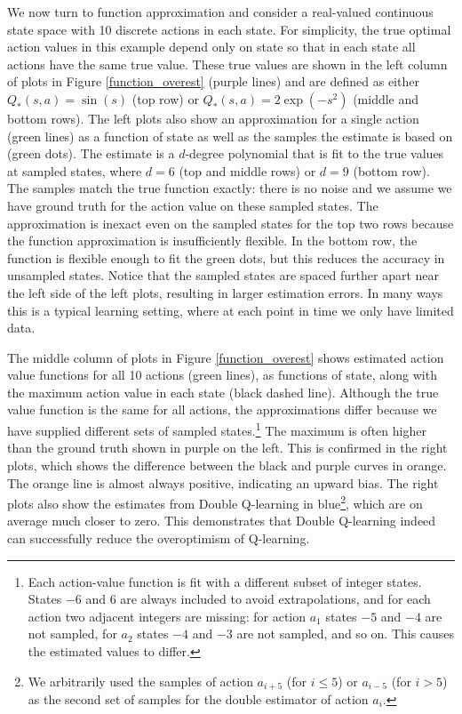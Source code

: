 \documentclass[letterpaper]{article}
\begin{document}
We now turn to function approximation and consider a real-valued continuous state space with 10 discrete actions in each state. For simplicity, the true optimal action values in this example depend only on state so that in each state all actions have the same true value. These true values are shown in the left column of plots in Figure \ref{function_overest} (purple lines) and are defined as either $Q_*(s,a) = \sin(s)$ (top row) or $Q_*(s,a) = 2 \exp(-s^2)$ (middle and bottom rows). The left plots also show an approximation for a single action (green lines) as a function of state as well as the samples the estimate is based on (green dots).  The estimate is a $d$-degree polynomial that is fit to the true values at sampled states, where $d=6$ (top and middle rows) or $d=9$ (bottom row). The samples match the true function exactly: there is no noise and we assume we have ground truth for the action value on these sampled states.  The approximation is inexact even on the sampled states for the top two rows because the function approximation is insufficiently flexible. In the bottom row, the function is flexible enough to fit the green dots, but this reduces the accuracy in unsampled states.   Notice that the sampled states are spaced further apart near the left side of the left plots, resulting in larger estimation errors.  In many ways this is a typical learning setting, where at each point in time we only have limited data.

The middle column of plots in Figure \ref{function_overest} shows estimated action value functions for all 10 actions (green lines), as functions of state, along with the maximum action value in each state (black dashed line).  Although the true value function is the same for all actions, the approximations differ because we have supplied different sets of sampled states.\footnote{Each action-value function is fit with a different subset of integer states. States $-6$ and $6$ are always included to avoid extrapolations, and for each action two adjacent integers are missing: for action $a_1$ states $-5$ and $-4$ are not sampled, for $a_2$ states $-4$ and $-3$ are not sampled, and so on. This causes the estimated values to differ.} The maximum is often higher than the ground truth shown in purple on the left.  This is confirmed in the right plots, which shows the difference between the black and purple curves in orange.  The orange line is almost always positive, indicating an upward bias. The right plots also show the estimates from Double Q-learning in blue\footnote{We arbitrarily used the samples of action $a_{i+5}$ (for $i\le 5$) or $a_{i-5}$ (for $i > 5$) as the second set of samples for the double estimator of action $a_i$.}, which are on average much closer to zero.  This demonstrates that Double Q-learning indeed can successfully reduce the overoptimism of Q-learning.
\end{document}
